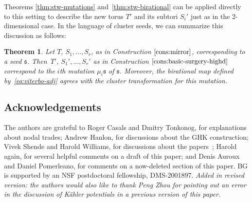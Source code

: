 \documentclass[10pt,a4paper]{amsart}
\numberwithin{equation}{section}
\newtheorem{Theorem}{Theorem}[section]
\newcommand\frs{\mathfrak{s}}
\begin{document}
 Theorems \ref{thm:stw-mutations} and~\ref{thm:stw-birational} can be applied directly to this setting to describe the new torus $T'$ and its subtori $S_i'$ just as in the 2-dimensional case. In the language of cluster seeds, we can summarize this discussion as follows:
\begin{Theorem}
 Let $T$, $S_1,\dots,S_r$, as in Construction $\ref{cons:mirror}$, corresponding to a seed $\frs$. Then~$T'$, $S_1',\dots,S_r'$ as in Construction $\ref{cons:basic-surgery-highd}$ correspond to the $i$th mutation $\mu_i\frs$ of $\frs$. Moreover, the birational map defined by~\eqref{eq:viterbo-adj} agrees with the cluster transformation for this mutation.
\end{Theorem}


\subsection*{Acknowledgements}The authors are grateful to Roger Casals and Dmitry Tonkonog, for explanations about nodal trades; Andrew Hanlon, for discussions about the GHK construction; Vivek Shende and Harold Williams, for discussions about the papers~\cite{STW,STWZ}; Harold again, for several helpful comments on a draft of this paper; and
Denis Auroux and Daniel Pomerleano, for comments on a now-deleted section of this paper.
BG is supported by an NSF postdoctoral fellowship, DMS-2001897.
\textit{Added in revised version: the authors would also like to thank Peng Zhou for pointing out an error in the discussion of K\"ahler potentials in a previous version of this paper.}

\end{document}
